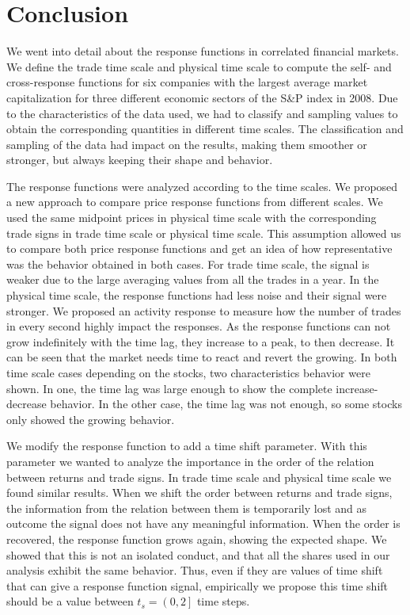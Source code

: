 \section{Conclusion}\label{sec:conclusion}

We went into detail about the response functions in correlated financial
markets. We define the trade time scale and physical time scale to compute the
self- and cross-response functions for six companies with the largest average
market capitalization for three different economic sectors of the S\&P index
in 2008.
Due to the characteristics of the data used, we had to classify and sampling
values to obtain the corresponding quantities in different time scales.
The classification and sampling of the data had impact on the results, making
them smoother or stronger, but always keeping their shape and behavior.

The response functions were analyzed according to the time scales. We proposed
a new approach to compare price response functions from different scales. We
used the same midpoint prices in physical time scale with the corresponding
trade signs in trade time scale or physical time scale. This assumption allowed
us to compare both price response functions and get an idea of how
representative was the behavior obtained in both cases. For trade time scale,
the signal is weaker due to the large averaging values from all the trades in a
year. In the physical time scale, the response functions had less noise and
their signal were stronger. We proposed an activity response to measure how the
number of trades in every second highly impact the responses. As the response
functions can not grow indefinitely with the time lag, they increase to a peak,
to then decrease. It can be seen that the market needs time to react and revert
the growing. In both time scale cases depending on the stocks, two
characteristics behavior were shown. In one, the time lag was large enough to
show the complete increase-decrease behavior. In the other case, the time lag
was not enough, so some stocks only showed the growing behavior.

We modify the response function to add a time shift parameter. With this
parameter we wanted to analyze the importance in the order of the relation
between returns and trade signs. In trade time scale and physical time scale we
found similar results. When we shift the order between returns and trade signs,
the information from the relation between them is temporarily lost and as
outcome the signal does not have any meaningful information. When the order is
recovered, the response function grows again, showing the expected shape.
We showed that this is not an isolated conduct, and that all the shares used in
our analysis exhibit the same behavior. Thus, even if they are values of time
shift that can give a response function signal, empirically we propose this
time shift should be a value between $t_{s} = \left(0,2\right]$ time steps.

